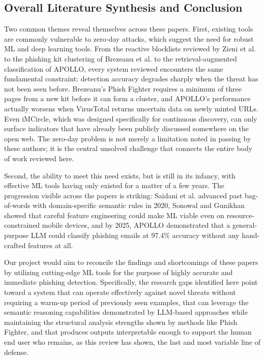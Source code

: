 \documentclass[conference]{IEEEtran}
\begin{document}
\subsection{Overall Literature Synthesis and Conclusion}
Two common themes reveal themselves across these papers. First, existing tools are commonly vulnerable to zero-day attacks, which suggest the need for robust ML and deep learning tools. From the reactive blocklists reviewed by Zieni et al.\cite{zieni_phishing_2023} to the phishing kit clustering of Brezeanu et al.\cite{brezeanu_phish_2025} to the retrieval-augmented classification of APOLLO\cite{desolda_apollo_2025}, every system reviewed encounters the same fundamental constraint: detection accuracy degrades sharply when the threat has not been seen before. Brezeanu's Phish Fighter requires a minimum of three pages from a new kit before it can form a cluster, and APOLLO's performance actually worsens when VirusTotal returns uncertain data on newly minted URLs. Even iMCircle, which was designed specifically for continuous discovery, can only surface indicators that have already been publicly discussed somewhere on the open web\cite{zhang1}. The zero-day problem is not merely a limitation noted in passing by these authors; it is the central unsolved challenge that connects the entire body of work reviewed here.

Second, the ability to meet this need exists, but is still in its infancy, with effective ML tools having only existed for a matter of a few years. The progression visible across the papers is striking: Saidani et al.\cite{saidani1} advanced past bag-of-words with domain-specific semantic rules in 2020, Sonowal and Gunikhan\cite{sonowal1} showed that careful feature engineering could make ML viable even on resource-constrained mobile devices, and by 2025, APOLLO demonstrated that a general-purpose LLM could classify phishing emails at 97.4\% accuracy without any hand-crafted features at all\cite{desolda_apollo_2025}. 

Our project would aim to reconcile the findings and shortcomings of these papers by utilizing cutting-edge ML tools for the purpose of highly accurate and immediate phishing detection. Specifically, the research gaps identified here point toward a system that can operate effectively against novel threats without requiring a warm-up period of previously seen examples, that can leverage the semantic reasoning capabilities demonstrated by LLM-based approaches while maintaining the structural analysis strengths shown by methods like Phish Fighter, and that produces outputs interpretable enough to support the human end user who remains, as this review has shown, the last and most variable line of defense.
\end{document}
